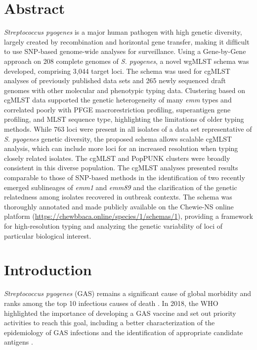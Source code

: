 \section{Abstract} \label{sec:ch4_abstract}

\textit{Streptococcus pyogenes} is a major human pathogen with high genetic diversity, largely created by recombination and horizontal gene transfer, making it difﬁcult to use \ac{SNP}-based genome-wide analyses for surveillance. Using a Gene-by-Gene approach on 208 complete genomes of \textit{S. pyogenes}, a novel \ac{wgMLST} schema was developed, comprising 3,044 target loci. The schema was used for \ac{cgMLST} analyses of previously published data sets and 265 newly sequenced draft genomes with other molecular and phenotypic typing data. Clustering based on \ac{cgMLST} data supported the genetic heterogeneity of many \textit{emm} types and correlated poorly with \ac{PFGE} macrorestriction proﬁling, superantigen gene proﬁling, and \ac{MLST} sequence type, highlighting the limitations of older typing methods. While 763 loci were present in all isolates of a data set representative of \textit{S. pyogenes} genetic diversity, the proposed schema allows scalable \ac{cgMLST} analysis, which can include more loci for an increased resolution when typing closely related isolates. The \ac{cgMLST} and PopPUNK clusters were broadly consistent in this diverse population. The \ac{cgMLST} analyses presented results comparable to those of \ac{SNP}-based methods in the identiﬁcation of two recently emerged sublineages of \textit{emm1} and \textit{emm89} and the clariﬁcation of the genetic relatedness among isolates recovered in outbreak contexts. The schema was thoroughly annotated and made publicly available on the \ac{Chewie-NS} online platform (\url{https://chewbbaca.online/species/1/schemas/1}), providing a framework for high-resolution typing and analyzing the genetic variability of loci of particular biological interest.

\section{Introduction} \label{sec:ch4_introduction}

\textit{Streptococcus pyogenes} (\ac{GAS}) remains a signiﬁcant cause of global morbidity and ranks among the top 10 infectious causes of death \cite{carapetis_global_2005}. In 2018, the \ac{WHO} highlighted the importance of developing a \ac{GAS} vaccine and set out priority activities to reach this goal, including a better characterization of the epidemiology of \ac{GAS} infections and the identification of appropriate candidate antigens \cite{vekemans_path_2019}.

